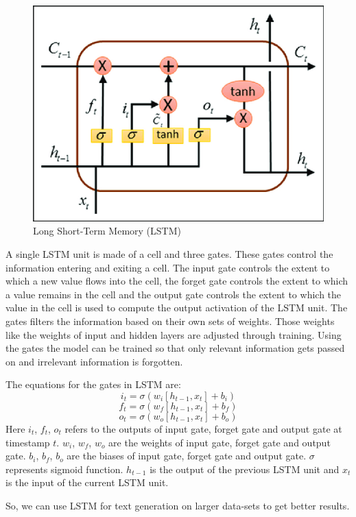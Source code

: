 \documentclass[11pt,a4paper]{article}
\begin{document}
\begin{figure}[h]
\includegraphics[width=\columnwidth]{LSTM.png}
\caption{Long Short-Term Memory (LSTM)}
\end{figure}

A single LSTM unit is made of a cell and three gates. These gates control the information entering and exiting a cell. The input gate controls the extent to which a new value flows into the cell, the forget gate controls the extent to which a value remains in the cell and the output gate controls the extent to which the value in the cell is used to compute the output activation of the LSTM unit. The gates filters the information based on their own sets of weights. Those weights like the weights of input and hidden layers are adjusted through training. Using the gates the model can be trained so that only relevant information gets passed on and irrelevant information is forgotten.

The equations for the gates in LSTM are:
\[i_t= \sigma(w_i[h_{t-1},x_t]+b_i) \]
\[f_t= \sigma(w_f[h_{t-1},x_t]+b_f) \]
\[o_t= \sigma(w_o[h_{t-1},x_t]+b_o) \]
Here \(i_t\), \(f_t\), \(o_t\) refers to the outputs of input gate, forget gate and output gate at timestamp \(t\). \(w_i\), \(w_f\), \(w_o\) are the weights of input gate, forget gate and output gate. \(b_i\), \(b_f\), \(b_o\) are the biases of input gate, forget gate and output gate. \(\sigma\)  represents sigmoid function. \(h_{t-1}\) is the output of the previous LSTM unit and \(x_t\) is the input of the current LSTM unit.

So, we can use LSTM for text generation on larger data-sets to get better results.
\end{document}

